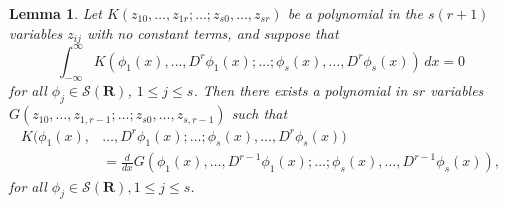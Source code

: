 \documentclass{surv-l}
\theoremstyle{plain}
\newtheorem{lemma}[theorem]{Lemma}
\theoremstyle{definition}
\numberwithin{equation}{chapter}
\begin{document}
\setcounter{theorem}{25}
\begin{lemma}\label{lem35.26}
Let $K(z_{10},\ldots,z_{1r};\ldots;z_{s0},\ldots,z_{sr})$ be a polynomial in the $s(r+1)$ variables $z_{ij}$ with no constant terms, and suppose that
\setcounter{equation}{26}
\begin{equation}\label{eq35.27}
\int_{-\infty}^{\infty}K(\phi_{1}(x),\ldots,D^{r}\phi_{1}(x);\ldots;\phi_{s}(x),\ldots, D^{r}\phi_{s}(x))\,dx=0
\end{equation}
for all $\phi_{j}\in \mathscr{S}(\mathbf{R})$, $1\leq j\leq s$. Then there exists a polynomial in $sr$ variables $G(z_{10},\ldots,z_{1,r-1};\ldots;z_{s0}, \ldots, z_{s,r-1})$ such that
\begin{align}\label{eq35.28}
K(\phi_{1}(x),&\ldots, D^{r}\phi_{1}(x);\ldots;\phi_{s}(x), \ldots, D^{r}\phi_{s}(x))\\
&=\frac{d}{dx}G(\phi_{1}(x), \ldots, D^{r-1}\phi_{1}(x);\ldots;\phi_{s}(x),\ldots, D^{r-1}\phi_{s}(x)),\nonumber
\end{align}
for all $\phi_{j}\in \mathscr{S}(\mathbf{R}), 1\leq j\leq s$.
\end{lemma}
\end{document}
